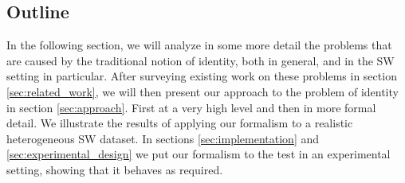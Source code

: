 \subsection{Outline}

In the following section,
  we will analyze in some more detail the problems that
  are caused by the traditional notion of identity, both in general,
  and in the SW setting in particular.
After surveying existing work on these problems
  in section \ref{sec:related_work},
  we will then present our approach to the problem of identity
  in section \ref{sec:approach}.
First at a very high level and then in more formal detail.
We illustrate the results of applying our formalism to
  a realistic heterogeneous SW dataset.
In sections \ref{sec:implementation} and \ref{sec:experimental_design}
  we put our formalism to the test
  in an experimental setting,
  showing that it behaves as required.
